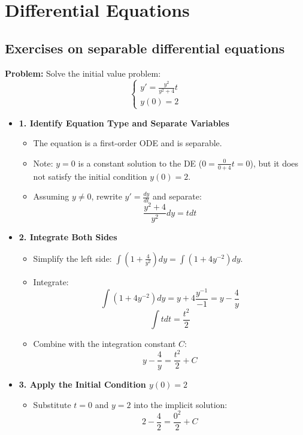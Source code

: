 \section{Differential Equations}

\subsection{Exercises on separable differential equations}

\begin{cascade}
	\textbf{Problem:} Solve the initial value problem:
	$$ \begin{cases} y' = \frac{y^2}{y^2+4} t \\ y(0) = 2 \end{cases} $$
	\begin{itemize}
		\item \textbf{1. Identify Equation Type and Separate Variables}
		      \begin{itemize}
			      \item The equation is a first-order ODE and is separable.
			      \item Note: $y=0$ is a constant solution to the DE ($0 = \frac{0}{0+4}t = 0$), but it does not satisfy the initial condition $y(0)=2$.
			      \item Assuming $y \neq 0$, rewrite $y' = \frac{dy}{dt}$ and separate:
			            $$ \frac{y^2+4}{y^2} dy = t dt $$
		      \end{itemize}
		\item \textbf{2. Integrate Both Sides}
		      \begin{itemize}
			      \item Simplify the left side: $\int \left(1 + \frac{4}{y^2}\right) dy = \int (1 + 4y^{-2}) dy$.
			      \item Integrate:
			            $$ \int (1 + 4y^{-2}) dy = y + 4 \frac{y^{-1}}{-1} = y - \frac{4}{y} $$
			            $$ \int t dt = \frac{t^2}{2} $$
			      \item Combine with the integration constant $C$:
			            $$ y - \frac{4}{y} = \frac{t^2}{2} + C $$
		      \end{itemize}
		\item \textbf{3. Apply the Initial Condition $y(0)=2$}
		      \begin{itemize}
			      \item Substitute $t=0$ and $y=2$ into the implicit solution:
			            $$ 2 - \frac{4}{2} = \frac{0^2}{2} + C $$

\end{itemize}
\end{itemize}
\end{cascade}
